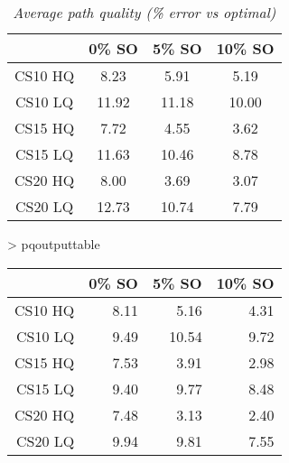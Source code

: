 \begin{table}[ht]
\begin{center}
\caption{\small{\emph{Average path quality (\% error vs optimal)}}}
\label{aha-table:pathquality}
\begin{tabular*}{0.4\textwidth}{@{\extracolsep{\fill}}cccc}%
  \hline
 & \small{0\% SO} & \small{5\% SO} & \small{10\% SO} \\
  \hline
 \small{CS10 HQ} & \small{8.23} & \small{5.91} & \small{5.19} \\
 \small{CS10 LQ} & \small{11.92} & \small{11.18} & \small{10.00} \\
 \small{CS15 HQ} & \small{7.72} & \small{4.55} & \small{3.62} \\
 \small{CS15 LQ} & \small{11.63} & \small{10.46} & \small{8.78} \\
 \small{CS20 HQ} & \small{8.00} & \small{3.69} & \small{3.07} \\
 \small{CS20 LQ} & \small{12.73} & \small{10.74} & \small{7.79} \\
   \hline
\end{tabular*}
\end{center}
\end{table}
> pqoutputtable
\begin{table}[ht]
\begin{center}
\begin{tabular}{rrrr}
  \hline
 & 0\% SO & 5\% SO & 10\% SO \\
  \hline
CS10 HQ & 8.11 & 5.16 & 4.31 \\
  CS10 LQ & 9.49 & 10.54 & 9.72 \\
  CS15 HQ & 7.53 & 3.91 & 2.98 \\
  CS15 LQ & 9.40 & 9.77 & 8.48 \\
  CS20 HQ & 7.48 & 3.13 & 2.40 \\
  CS20 LQ & 9.94 & 9.81 & 7.55 \\
   \hline
\end{tabular}
\end{center}
\end{table}
